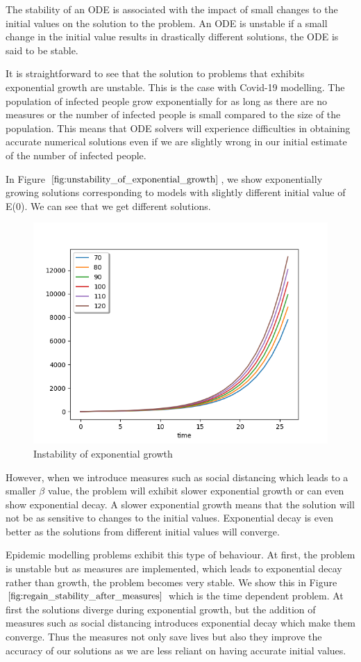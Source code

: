 The stability of an ODE is associated with the impact of small changes to the initial values on the solution to the problem. An ODE is unstable if a small change in the initial value results in drastically different solutions, the ODE is said to be stable.

It is straightforward to see that the solution to problems that exhibits exponential growth are unstable. This is the case with Covid-19 modelling. The population of infected people grow exponentially for as long as there are no measures or the number of infected people is small compared to the size of the population. This means that ODE solvers will experience difficulties in obtaining accurate numerical solutions even if we are slightly wrong in our initial estimate of the number of infected people. 

In Figure $\ref{fig:unstability_of_exponential_growth}$, we show exponentially growing solutions corresponding to models with slightly different initial value of E(0). We can see that we get different solutions.

\begin{figure}[h]
	\centering
	\includegraphics[width=0.7\linewidth]{./figures/unstability_of_exponential_growth}
	\caption{Instability of exponential growth}
	\label{fig:unstability_of_exponential_growth}
\end{figure}

However, when we introduce measures such as social distancing which leads to a smaller $\beta$ value, the problem will exhibit slower exponential growth or can even show exponential decay. A slower exponential growth means that the solution will not be as sensitive to changes to the initial values. Exponential decay is even better as the solutions from different initial values will converge.

Epidemic modelling problems exhibit this type of behaviour. At first, the problem is unstable but as measures are implemented, which leads to exponential decay rather than growth, the problem becomes very stable. We show this in Figure $\ref{fig:regain_stability_after_measures}$ which is the time dependent problem. At first the solutions diverge during exponential growth, but the addition of measures such as social distancing introduces exponential decay which make them converge. Thus the measures not only save lives but also they improve the accuracy of our solutions as we are less reliant on having accurate initial values.


